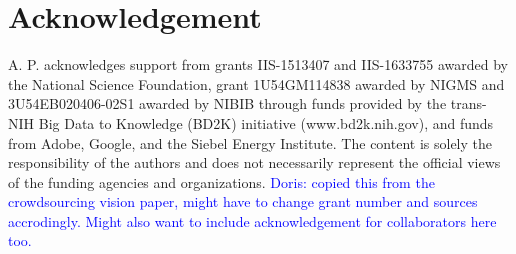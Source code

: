 \documentclass[11pt]{article}
\newcommand{\dor}[1]{\textcolor{blue}{Doris: #1}}
\begin{document}
\begin{abstract}
\end{abstract}






\section*{Acknowledgement}
A. P. acknowledges support from grants IIS-1513407 and IIS-1633755 awarded by the National Science Foundation, grant 1U54GM114838 awarded by NIGMS and 3U54EB020406-02S1 awarded by NIBIB through funds provided by the trans-NIH Big Data to Knowledge (BD2K) initiative (www.bd2k.nih.gov), and funds from Adobe, Google, and the Siebel Energy Institute. The content is solely the responsibility of the
authors and does not necessarily represent the official views of the funding agencies and organizations. \dor{copied this from the crowdsourcing vision paper, might have to change grant number and sources accrodingly. Might also want to include acknowledgement for collaborators here too.}
{\footnotesize 
}
\end{document}
